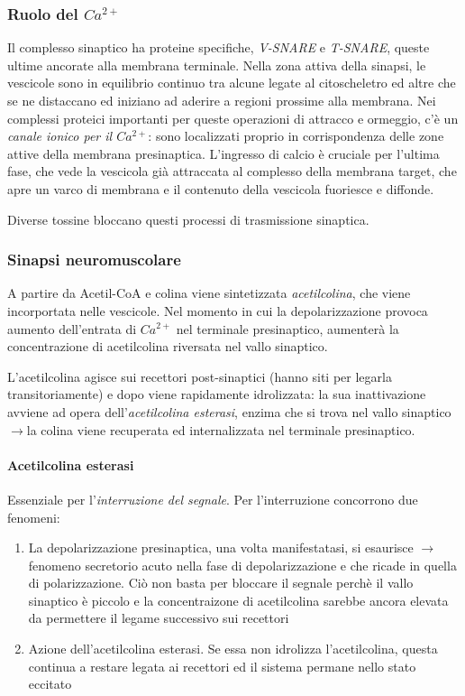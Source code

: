 \documentclass[a4paper,12pt]{article}
\newcommand{\lfreccia}{\ensuremath{\longrightarrow}}
\begin{document}
\subsubsection{Ruolo del $Ca^{2+}$}
Il complesso sinaptico ha proteine specifiche, \emph{V-SNARE} e \emph{T-SNARE}, queste ultime ancorate alla membrana terminale. Nella zona attiva della sinapsi, le vescicole sono in equilibrio continuo tra alcune legate al citoscheletro ed altre che se ne distaccano ed iniziano ad aderire a regioni prossime alla membrana. Nei complessi proteici importanti per queste operazioni di attracco e ormeggio, c'è un \emph{canale ionico per il $Ca^{2+}$}: sono localizzati proprio in corrispondenza delle zone attive della membrana presinaptica. L'ingresso di calcio è cruciale per l'ultima fase, che vede la vescicola già attraccata al complesso della membrana target, che apre un varco di membrana e il contenuto della vescicola fuoriesce e diffonde.

Diverse tossine bloccano questi processi di trasmissione sinaptica.

\subsubsection{Sinapsi neuromuscolare}
A partire da Acetil-CoA e colina viene sintetizzata \emph{acetilcolina}, che viene incorportata nelle vescicole. Nel momento in cui la depolarizzazione provoca aumento dell'entrata di $Ca^{2+}$ nel terminale presinaptico, aumenterà la concentrazione di acetilcolina riversata nel vallo sinaptico.

L'acetilcolina agisce sui recettori post-sinaptici (hanno siti per legarla transitoriamente) e dopo viene rapidamente idrolizzata: la sua inattivazione avviene ad opera dell'\emph{acetilcolina esterasi}, enzima che si trova nel vallo sinaptico \lfreccia la colina viene recuperata ed internalizzata nel terminale presinaptico.

\paragraph{Acetilcolina esterasi}
Essenziale per l'\emph{interruzione del segnale}. Per l'interruzione concorrono due fenomeni:
\begin{enumerate}
\item{La depolarizzazione presinaptica, una volta manifestatasi, si esaurisce \lfreccia fenomeno secretorio acuto nella fase di depolarizzazione e che ricade in quella di polarizzazione. Ciò non basta per bloccare il segnale perchè il vallo sinaptico è piccolo e la concentraizone di acetilcolina sarebbe ancora elevata da permettere il legame successivo sui recettori}
\item{Azione dell'acetilcolina esterasi. Se essa non idrolizza l'acetilcolina, questa continua a restare legata ai recettori ed il sistema permane nello stato eccitato}
\end{enumerate}
\end{document}
